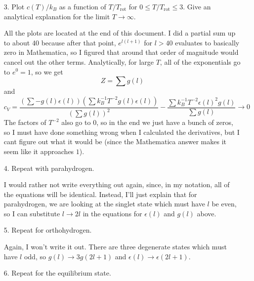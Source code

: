 \documentclass[a4paper,twoside]{article}
\begin{document}
\begin{itemize}
\begin{problem}
        \end{problem}
    \item[3.] Plot $ c(T) / k_B $ as a function of $ T/T_{\text{rot}} $ for $ 0 \leq T/T_{\text{rot}} \leq 3 $. Give an analytical explanation for the limit $ T \to \infty $.
        \begin{problem}
            All the plots are located at the end of this document. I did a partial sum up to about 40 because after that point, $ e^{l(l+1)} $ for $ l > 40 $ evaluates to basically zero in Mathematica, so I figured that around that order of magnitude would cancel out the other terms. Analytically, for large $ T $, all of the exponentials go to $ e^{0} = 1 $, so we get
            \begin{equation}
                Z = \sum g(l) 
            \end{equation}
            and
            \begin{equation}
                c_V = \frac{(\sum - g(l) \epsilon(l)) (\sum k_B^{-1} T^{-2} g(l) \epsilon(l))}{(\sum g(l))^2} - \frac{\sum k_B^{-1} T^{-2}\epsilon(l)^2 g(l)}{\sum g(l)} \to 0
            \end{equation}
            The factors of $ T^{-2} $ also go to $ 0 $, so in the end we just have a bunch of zeros, so I must have done something wrong when I calculated the derivatives, but I cant figure out what it would be (since the Mathematica answer makes it seem like it approaches $ 1 $).
        \end{problem}
    \item[4.] Repeat with parahydrogen.
        \begin{problem}
            I would rather not write everything out again, since, in my notation, all of the equations will be identical. Instead, I'll just explain that for parahydrogen, we are looking at the singlet state which must have $ l $ be even, so I can substitute $ l \to 2l $ in the equations for $ \epsilon(l) $ and $ g(l) $ above.
        \end{problem}
    \item[5.] Repeat for orthohydrogen.
        \begin{problem}
            Again, I won't write it out. There are three degenerate states which must have $ l $ odd, so $ g(l) \to 3g(2l+1) $ and $ \epsilon(l) \to \epsilon(2l+1) $.
        \end{problem}
    \item[6.] Repeat for the equilibrium state.
        \begin{problem}

\end{problem}
\end{itemize}
\end{document}
